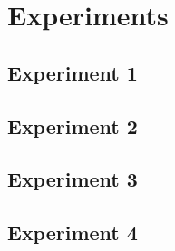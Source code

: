 \chapter{Experiments}
\label{exp}

\section{Experiment 1}


\section{Experiment 2}


\section{Experiment 3}


\section{Experiment 4}

